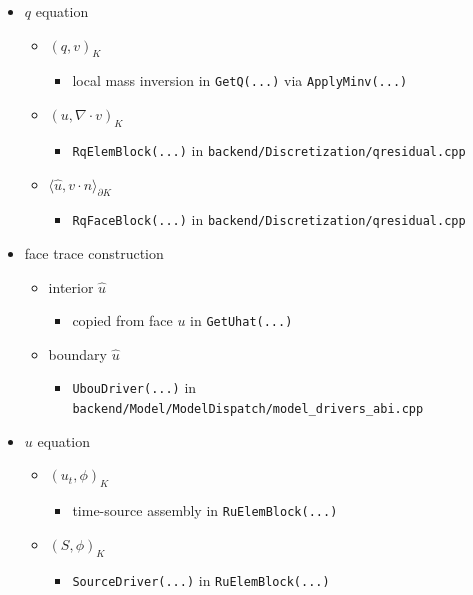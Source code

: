 \documentclass[11pt]{article}
\begin{document}
\begin{itemize}[leftmargin=*]
\item $q$ equation
\begin{itemize}[leftmargin=*]
\item $(q, v)_K$
\begin{itemize}[leftmargin=*]
\item local mass inversion in \texttt{GetQ(...)} via \texttt{ApplyMinv(...)}
\end{itemize}
\item $(u, \nabla \cdot v)_K$
\begin{itemize}[leftmargin=*]
\item \texttt{RqElemBlock(...)} in \texttt{backend/Discretization/qresidual.cpp}
\end{itemize}
\item $\langle \hat{u}, v \cdot n \rangle_{\partial K}$
\begin{itemize}[leftmargin=*]
\item \texttt{RqFaceBlock(...)} in \texttt{backend/Discretization/qresidual.cpp}
\end{itemize}
\end{itemize}
\item face trace construction
\begin{itemize}[leftmargin=*]
\item interior $\hat{u}$
\begin{itemize}[leftmargin=*]
\item copied from face $u$ in \texttt{GetUhat(...)}
\end{itemize}
\item boundary $\hat{u}$
\begin{itemize}[leftmargin=*]
\item \texttt{UbouDriver(...)} in
\texttt{backend/Model/ModelDispatch/model\_drivers\_abi.cpp}
\end{itemize}
\end{itemize}
\item $u$ equation
\begin{itemize}[leftmargin=*]
\item $(u_t, \phi)_K$
\begin{itemize}[leftmargin=*]
\item time-source assembly in \texttt{RuElemBlock(...)}
\end{itemize}
\item $(S, \phi)_K$
\begin{itemize}[leftmargin=*]
\item \texttt{SourceDriver(...)} in \texttt{RuElemBlock(...)}

\end{itemize}
\end{itemize}
\end{itemize}
\end{document}
